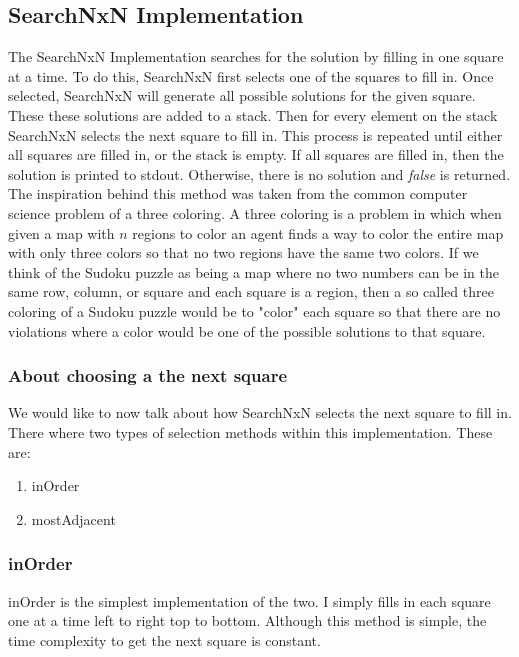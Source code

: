 \documentclass[letterpaper]{article}
\begin{document}
\subsection{SearchNxN Implementation}
The SearchNxN Implementation searches for the solution by filling in one square at a time. To do this, SearchNxN first selects one of the squares to fill in. Once selected, SearchNxN will generate all possible solutions for the given square. These these solutions are added to a stack. Then for every element on the stack SearchNxN selects the next square to fill in. This process is repeated until either all squares are filled in, or the stack is empty. If all squares are filled in, then the solution is printed to stdout. Otherwise, there is no solution and \emph{false} is returned. The inspiration behind this method was taken from the common computer science problem of a three coloring. A three coloring is a problem in which when given a map with $n$ regions to color an agent finds a way to color the entire map with only three colors so that no two regions have the same two colors. If we think of the Sudoku puzzle as being a map where no two numbers can be in the same row, column, or square and each square is a region, then a so called three coloring of a Sudoku puzzle would be to "color" each square so that there are no violations where a color would be one of the possible solutions to that square.

\subsubsection{About choosing a the next square}
We would like to now talk about how SearchNxN selects the next square to fill in. There where two types of selection methods within this implementation. These are:
\begin{enumerate}
\item inOrder
\item mostAdjacent
\end{enumerate}

\subsubsection{inOrder}
inOrder is the simplest implementation of the two. I simply fills in each square one at a time left to right top to bottom. Although this method is simple, the time complexity to get the next square is constant.
\end{document}
